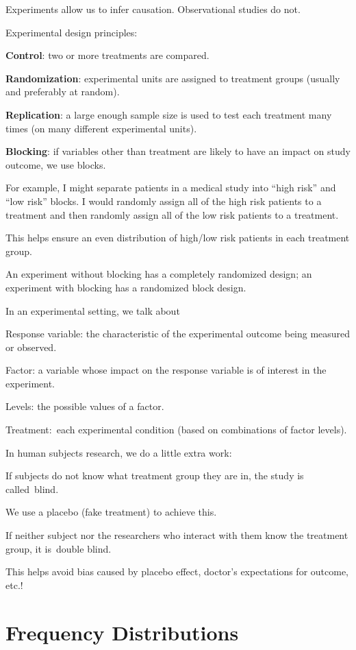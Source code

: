 \documentclass[
]{book}
\begin{document}
Experiments allow us to infer causation. Observational studies do not.

Experimental design principles:

\textbf{Control}: two or more treatments are compared.

\textbf{Randomization}: experimental units are assigned to treatment groups (usually and preferably at random).

\textbf{Replication}: a large enough sample size is used to test each treatment many times (on many different experimental units).

\textbf{Blocking}: if variables other than treatment are likely to have an impact on study outcome, we use blocks.

For example, I might separate patients in a medical study into ``high risk'' and ``low risk'' blocks. I would randomly assign all of the high risk patients to a treatment and then randomly assign all of the low risk patients to a treatment.

This helps ensure an even distribution of high/low risk patients in each treatment group.

An experiment without blocking has a completely randomized design; an experiment with blocking has a randomized block design.

In an experimental setting, we talk about

Response variable: the characteristic of the experimental outcome being measured or observed.

Factor: a variable whose impact on the response variable is of interest in the experiment.

Levels: the possible values of a factor.

Treatment:~each experimental condition (based on combinations of factor levels).

In human subjects research, we do a little extra work:

If subjects do not know what treatment group they are in, the study is called~blind.

We use a placebo (fake treatment) to achieve this.

If neither subject nor the researchers who interact with them know the treatment group, it is~double blind.

This helps avoid bias caused by placebo effect, doctor's expectations for outcome, etc.!

\hypertarget{frequency-distributions}{%
\section{Frequency Distributions}\label{frequency-distributions}}
\end{document}
